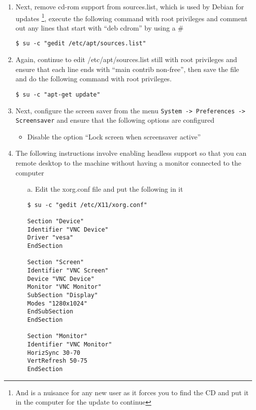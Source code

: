 \begin{enumerate}
\item Next, remove cd-rom support from sources.list, which is used by Debian for updates \footnote{And is a nuisance for any new user
as it forces you to find the CD and put it in the computer for the update to continue}, execute the following command with root privileges
and comment out any lines that start with ``deb cdrom'' by using a \#

\lstset{language=bash,caption=Removing CD-ROM Requirement for Updates}
\begin{lstlisting}
$ su -c "gedit /etc/apt/sources.list"
\end{lstlisting}

\item	Again, continue to edit /etc/apt/sources.list still with root privileges and ensure that each line ends with ``main 
		contrib non-free'', then save the file and do the following command with root privileges.

\lstset{language=bash,caption=Updating the System}
\begin{lstlisting}
$ su -c "apt-get update"
\end{lstlisting}

\item Next, configure the screen saver from the menu \verb|System -> Preferences -> Screensaver| and ensure that the following options are 
configured
\begin{itemize}
\item	Disable the option ``Lock screen when screensaver active''
\end{itemize}

\item 	The following instructions involve enabling headless support so that you can remote desktop to the machine without having a 
		monitor connected to the computer
\begin{itemize}
\item[a.] Edit the xorg.conf file and put the following in it

\lstset{language=bash,caption=Configuring Xorg for Headless Support}
\begin{lstlisting}
$ su -c "gedit /etc/X11/xorg.conf"

Section "Device"
Identifier "VNC Device"
Driver "vesa"
EndSection

Section "Screen"
Identifier "VNC Screen"
Device "VNC Device"
Monitor "VNC Monitor"
SubSection "Display"
Modes "1280x1024"
EndSubSection
EndSection

Section "Monitor"
Identifier "VNC Monitor"
HorizSync 30-70
VertRefresh 50-75
EndSection
\end{lstlisting}
	

\end{itemize}
\end{enumerate}
